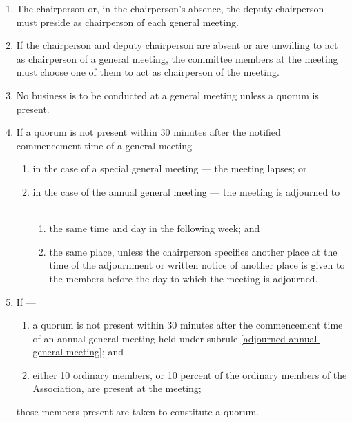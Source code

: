 \documentclass[../constitution.tex]{subfiles}
\begin{document}
\begin{enumerate}

  \item The chairperson or, in the chairperson's absence, the deputy chairperson must preside as chairperson of each general meeting.
  \item If the chairperson and deputy chairperson are absent or are unwilling to act as chairperson of a general meeting, the committee members at the meeting must choose one of them to act as chairperson of the meeting.
  \item No business is to be conducted at a general meeting unless a quorum is present.
  \item If a quorum is not present within 30 minutes after the notified commencement time of a general meeting ---

        \begin{enumerate}

          \item in the case of a special general meeting --- the meeting lapses; or
          \item in the case of the annual general meeting --- the meeting is adjourned to --- \label{adjourned-annual-general-meeting}

                \begin{enumerate}

                  \item the same time and day in the following week; and
                  \item the same place, unless the chairperson specifies another place at the time of the adjournment or written notice of another place is given to the members before the day to which the meeting is adjourned.
                \end{enumerate}
        \end{enumerate}
  \item If ---

        \begin{enumerate}

          \item a quorum is not present within 30 minutes after the commencement time of an annual general meeting held under subrule \ref{adjourned-annual-general-meeting}; and
          \item either 10 ordinary members, or 10 percent of the ordinary members of the Association, are present at the meeting;
        \end{enumerate}
        those members present are taken to constitute a quorum.
\end{enumerate}
\end{document}
